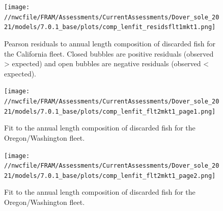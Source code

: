 \documentclass[11pt,
  english,
  a4paper,
]{article}
\begin{document}
\tagmcend\tagstructend


\begin{figure}
\centering
\texttt{[image: //nwcfile/FRAM/Assessments/CurrentAssessments/Dover\_sole\_2021/models/7.0.1\_base/plots/comp\_lenfit\_residsflt1mkt1.png]}
\caption{Pearson residuals to annual length composition of discarded fish for the California fleet. Closed bubbles are positive residuals (observed \textgreater{} expected) and open bubbles are negative residuals (observed \textless{} expected).\label{fig:ca-disc-pearson}}
\end{figure}

\tagmcend\tagstructend


\begin{figure}
\centering
\texttt{[image: //nwcfile/FRAM/Assessments/CurrentAssessments/Dover\_sole\_2021/models/7.0.1\_base/plots/comp\_lenfit\_flt2mkt1\_page1.png]}
\caption{Fit to the annual length composition of discarded fish for the Oregon/Washington fleet.\label{fig:orwa-disc-len-fit-1}}
\end{figure}

\tagmcend\tagstructend


\begin{figure}
\centering
\texttt{[image: //nwcfile/FRAM/Assessments/CurrentAssessments/Dover\_sole\_2021/models/7.0.1\_base/plots/comp\_lenfit\_flt2mkt1\_page2.png]}
\caption{Fit to the annual length composition of discarded fish for the Oregon/Washington fleet.\label{fig:orwa-disc-len-fit-2}}
\end{figure}

\tagmcend\tagstructend

\end{document}
